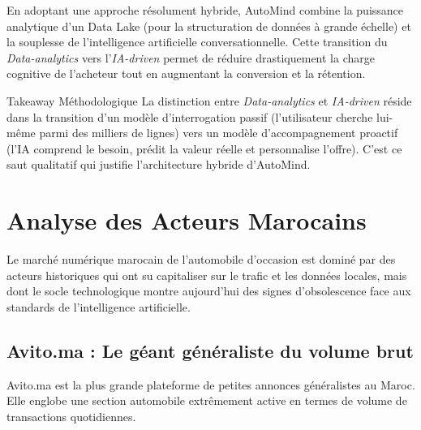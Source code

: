\documentclass[11pt,a4paper]{article}
\begin{document}
En adoptant une approche résolument hybride, AutoMind combine la puissance analytique d'un Data Lake (pour la structuration de données à grande échelle) et la souplesse de l'intelligence artificielle conversationnelle. Cette transition du \textit{Data-analytics} vers l'\textit{IA-driven} permet de réduire drastiquement la charge cognitive de l'acheteur tout en augmentant la conversion et la rétention.

\begin{insightbox}{Takeaway Méthodologique}
La distinction entre \textit{Data-analytics} et \textit{IA-driven} réside dans la transition d'un modèle d'interrogation passif (l'utilisateur cherche lui-même parmi des milliers de lignes) vers un modèle d'accompagnement proactif (l'IA comprend le besoin, prédit la valeur réelle et personnalise l'offre). C'est ce saut qualitatif qui justifie l'architecture hybride d'AutoMind.
\end{insightbox}

\newpage

\section{Analyse des Acteurs Marocains}

Le marché numérique marocain de l'automobile d'occasion est dominé par des acteurs historiques qui ont su capitaliser sur le trafic et les données locales, mais dont le socle technologique montre aujourd'hui des signes d'obsolescence face aux standards de l'intelligence artificielle.

\subsection{Avito.ma : Le géant généraliste du volume brut}
Avito.ma est la plus grande plateforme de petites annonces généralistes au Maroc. Elle englobe une section automobile extrêmement active en termes de volume de transactions quotidiennes.
\end{document}
